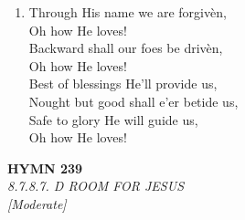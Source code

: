 \begin{enumerate}
    \item Through His name we are forgiv\`en, \\
            Oh how He loves! \\
        Backward shall our foes be driv\`en, \\
            Oh how He loves! \\
        Best of blessings He'll provide us, \\
        Nought but good shall e'er betide us, \\
        Safe to glory He will guide us, \\
            Oh how He loves!

\end{enumerate}

\newpage
\begin{center}
    {\Large \textbf{HYMN 239}}
    \\
    \textit{8.7.8.7. D ROOM FOR JESUS}
    \\
    \textit{\small [Moderate]}
\end{center}
\vspace{1em}

